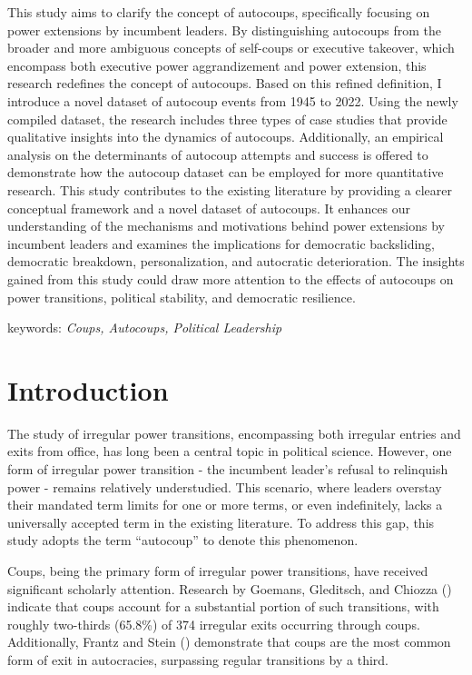 \documentclass[
  12pt,
]{report}
\begin{document}
This study aims to clarify the concept of autocoups, specifically
focusing on power extensions by incumbent leaders. By distinguishing
autocoups from the broader and more ambiguous concepts of self-coups or
executive takeover, which encompass both executive power aggrandizement
and power extension, this research redefines the concept of autocoups.
Based on this refined definition, I introduce a novel dataset of
autocoup events from 1945 to 2022. Using the newly compiled dataset, the
research includes three types of case studies that provide qualitative
insights into the dynamics of autocoups. Additionally, an empirical
analysis on the determinants of autocoup attempts and success is offered
to demonstrate how the autocoup dataset can be employed for more
quantitative research. This study contributes to the existing literature
by providing a clearer conceptual framework and a novel dataset of
autocoups. It enhances our understanding of the mechanisms and
motivations behind power extensions by incumbent leaders and examines
the implications for democratic backsliding, democratic breakdown,
personalization, and autocratic deterioration. The insights gained from
this study could draw more attention to the effects of autocoups on
power transitions, political stability, and democratic resilience.

keywords: \emph{Coups, Autocoups, Political Leadership}

\newpage

\section{Introduction}\label{introduction-2}

The study of irregular power transitions, encompassing both irregular
entries and exits from office, has long been a central topic in
political science. However, one form of irregular power transition - the
incumbent leader's refusal to relinquish power - remains relatively
understudied. This scenario, where leaders overstay their mandated term
limits for one or more terms, or even indefinitely, lacks a universally
accepted term in the existing literature. To address this gap, this
study adopts the term ``autocoup'' to denote this phenomenon.

Coups, being the primary form of irregular power transitions, have
received significant scholarly attention. Research by Goemans,
Gleditsch, and Chiozza () indicate that
coups account for a substantial portion of such transitions, with
roughly two-thirds (65.8\%) of 374 irregular exits occurring through
coups. Additionally, Frantz and Stein ()
demonstrate that coups are the most common form of exit in autocracies,
surpassing regular transitions by a third.
\end{document}
